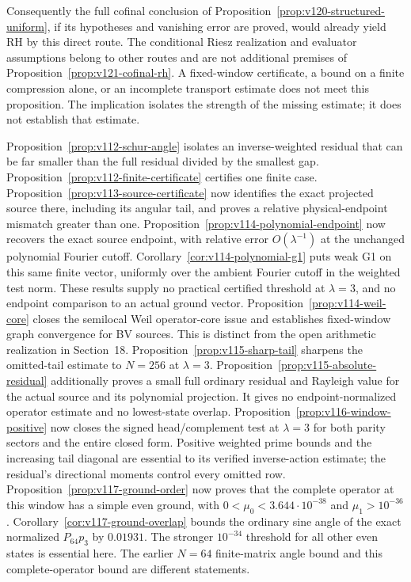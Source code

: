 \documentclass[11pt]{article}
\theoremstyle{remark}
\begin{document}
Consequently the full cofinal conclusion of
Proposition~\ref{prop:v120-structured-uniform}, if its hypotheses and
vanishing error are proved, would already yield RH by this direct route.
The conditional Riesz realization and evaluator assumptions belong to
other routes and are not additional premises of
Proposition~\ref{prop:v121-cofinal-rh}. A fixed-window certificate,
a bound on a finite compression alone, or an incomplete transport
estimate does not meet this proposition. The implication isolates the
strength of the missing estimate; it does not establish that estimate.



Proposition~\ref{prop:v112-schur-angle} isolates an inverse-weighted
residual that can be far smaller than the full residual divided by the
smallest gap. Proposition~\ref{prop:v112-finite-certificate} certifies
one finite case. Proposition~\ref{prop:v113-source-certificate} now
identifies the exact projected source there, including its angular tail,
and proves a relative physical-endpoint mismatch greater than one.
Proposition~\ref{prop:v114-polynomial-endpoint} now recovers the exact
source endpoint, with relative error $O(\lambda^{-1})$ at the unchanged
polynomial Fourier cutoff. Corollary~\ref{cor:v114-polynomial-g1}
puts weak G1 on this same finite vector, uniformly over the ambient
Fourier cutoff in the weighted test norm. These results supply no
practical certified threshold
at $\lambda=3$, and no endpoint comparison to an actual ground vector.
Proposition~\ref{prop:v114-weil-core} closes the semilocal Weil
operator-core issue and establishes fixed-window graph convergence for
BV sources. This is distinct from the open arithmetic realization in
Section~18. Proposition~\ref{prop:v115-sharp-tail} sharpens the omitted-tail
estimate to $N=256$ at $\lambda=3$. Proposition~\ref{prop:v115-absolute-residual}
additionally proves a small full ordinary residual and Rayleigh value
for the actual source and its polynomial projection. It gives no
endpoint-normalized operator estimate and no lowest-state overlap.
Proposition~\ref{prop:v116-window-positive} now closes the signed
head/complement test at $\lambda=3$ for both parity sectors and the
entire closed form. Positive weighted prime bounds and the increasing
tail diagonal are essential to its verified inverse-action estimate;
the residual's directional moments control every omitted row.
Proposition~\ref{prop:v117-ground-order} now proves that the complete
operator at this window has a simple even ground, with
$0<\mu_0<3.644\cdot10^{-38}$ and $\mu_1>10^{-36}$.
Corollary~\ref{cor:v117-ground-overlap} bounds the ordinary sine angle
of the exact normalized $P_{64}p_3$ by $0.01931$. The stronger
$10^{-34}$ threshold for all other even states is essential here.
The earlier $N=64$ finite-matrix angle bound and this complete-operator
bound are different statements.
\end{document}
